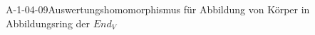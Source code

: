 
\begin{EXA}{A-1-04-09}{Auswertungshomomorphismus für Abbildung von Körper in Abbildungsring der $End_V$}
\end{EXA}
